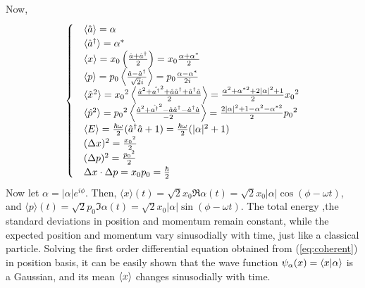 \documentclass[12pt, twoside]{article}
\begin{document}
Now, 
\begin{equation}
\begin{cases}

	&{ \langle \hat{a} \rangle = \alpha }\\
	&{ \langle \hat{a}^\dagger \rangle = \alpha^* }\\
	&{ \langle x \rangle = x _ { 0 } \left( \frac { \hat{a}+ \hat{a} ^ { \dagger } } { 2 } \right) = x _ { 0 } \frac{\alpha + \alpha^*}{2}}\\
	& { \langle p \rangle = p_0  \left\langle \frac { \hat{a}- \hat{a} ^ { \dagger } } { \sqrt { 2 } i } \right\rangle =  p_0 \frac{\alpha - \alpha^*}{2i} }\\
	& { \langle \hat{x}^2 \rangle = {x_0}^2  \left\langle \frac { \hat{a}^2 + \hat{a^ { \dagger }}^2 + \hat{a}\hat{a}^\dagger + \hat{a}^\dagger \hat{a} } { 2 } \right\rangle =  \frac{\alpha^2 + \alpha^{*2} + 2|\alpha|^2 + 1 }{2}{x_0}^2}\\
	& { \langle \hat{p}^2 \rangle = {p_0}^2  \left\langle \frac { \hat{a}^2 + \hat{a^ { \dagger }}^2 - \hat{a}\hat{a}^\dagger - \hat{a}^\dagger \hat{a} } { -2 } \right\rangle = \frac{ 2|\alpha|^2 + 1 -\alpha^2 - \alpha^{*2} }{2}{p_0}^2}\\
	& \expval{E} = \frac{\hbar\omega}{2}(\hat{a}^{\dagger}\hat{a}+1) = \frac{\hbar\omega}{2}(|\alpha|^2 + 1)\\
	& (\Delta x)^2 = \frac{{x_0}^2}{2}\\
	& (\Delta p)^2 = \frac{{p_0}^2}{2}\\
	& \Delta x \cdot \Delta p = x_0 p_0 = \frac{\hbar}{2} 
	
	\end{cases}\end{equation}
Now let $\alpha = |\alpha|e^{i\phi}$. Then, $\langle x \rangle (t) $$= \sqrt{2} x_0 \Re{\alpha(t)} $$= \sqrt{2} x_0 |\alpha| \cos(\phi-\omega t)$, and $ \langle p \rangle (t) $$= \sqrt{2} p_0 \Im{\alpha(t)} $$= \sqrt{2} x_0 |\alpha| \sin(\phi-\omega t)$. The total energy ,the standard deviations in position and momentum remain constant, while the expected position and momentum vary sinusodially with time, just like a classical particle. Solving the first order differential equation obtained from (\ref{eq:coherent}) in position basis, it can be easily shown that the wave function $\psi_\alpha (x) = \braket{x}{\alpha}$ is a Gaussian, and its mean $\expval{x}$ changes sinusodially with time.
\end{document}
